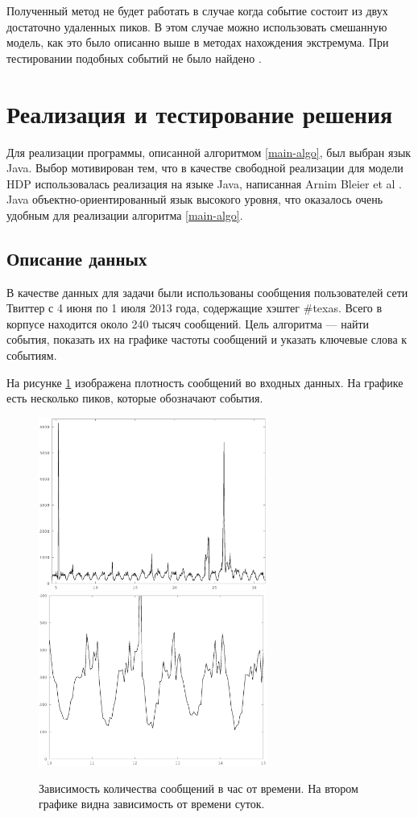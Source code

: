 \documentclass[12pt, a4paper]{article}
\begin{document}
  Полученный метод не будет работать в случае когда событие состоит из двух достаточно удаленных пиков. В этом случае можно использовать смешанную модель, как это было описанно выше в методах нахождения экстремума. При тестировании подобных событий не было найдено \cite{blei-sd}.
  

  \section{Реализация и тестирование решения}
  Для реализации программы, описанной алгоритмом \ref{main-algo}, был выбран язык Java. Выбор мотивирован тем, что в качестве свободной реализации для модели HDP использовалась реализация на языке Java, написанная Arnim Bleier et al \cite{hdp-2}. Java объектно-ориентированный язык высокого уровня, что оказалось очень удобным для реализации  алгоритма \ref{main-algo}.
  
  \subsection{Описание данных}
  В качестве данных для задачи были использованы сообщения пользователей сети Твиттер с 4 июня по 1 июля 2013 года, содержащие хэштег \#texas. Всего в корпусе находится около 240 тысяч сообщений. Цель алгоритма --- найти события, показать их на графике частоты сообщений и указать ключевые слова к событиям.
  
  На рисунке \ref{fig:all-freq} изображена плотность сообщений во входных данных. На графике есть несколько пиков, которые обозначают события. 
  \begin{figure}[H]
  \centering
  \label{fig:all-freq}
  \includegraphics[width=7.5cm]{all-freq.eps}
  \includegraphics[width=7.5cm]{all-freq-scaled.eps}
  \caption{Зависимость количества сообщений в час от времени. На втором графике видна зависимость от времени суток.}
  \end{figure}
  
\end{document}
